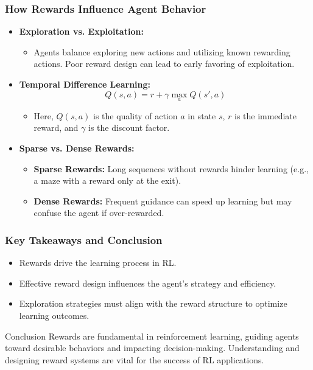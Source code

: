 \documentclass{beamer}
\begin{document}
\begin{frame}[fragile]
    \frametitle{How Rewards Influence Agent Behavior}
    \begin{itemize}
        \item \textbf{Exploration vs. Exploitation:}
        \begin{itemize}
            \item Agents balance exploring new actions and utilizing known rewarding actions. Poor reward design can lead to early favoring of exploitation.
        \end{itemize}

        \item \textbf{Temporal Difference Learning:}
        \begin{equation}
            Q(s, a) = r + \gamma \max_a Q(s', a)
        \end{equation}
        \begin{itemize}
            \item Here, \( Q(s, a) \) is the quality of action \( a \) in state \( s \), \( r \) is the immediate reward, and \( \gamma \) is the discount factor.
        \end{itemize}

        \item \textbf{Sparse vs. Dense Rewards:}
        \begin{itemize}
            \item \textbf{Sparse Rewards:} Long sequences without rewards hinder learning (e.g., a maze with a reward only at the exit).
            \item \textbf{Dense Rewards:} Frequent guidance can speed up learning but may confuse the agent if over-rewarded.
        \end{itemize}
    \end{itemize}
\end{frame}

\begin{frame}[fragile]
    \frametitle{Key Takeaways and Conclusion}
    \begin{itemize}
        \item Rewards drive the learning process in RL.
        \item Effective reward design influences the agent's strategy and efficiency.
        \item Exploration strategies must align with the reward structure to optimize learning outcomes.
    \end{itemize}
    \begin{block}{Conclusion}
        Rewards are fundamental in reinforcement learning, guiding agents toward desirable behaviors and impacting decision-making. Understanding and designing reward systems are vital for the success of RL applications.
    \end{block}
\end{frame}
\end{document}
